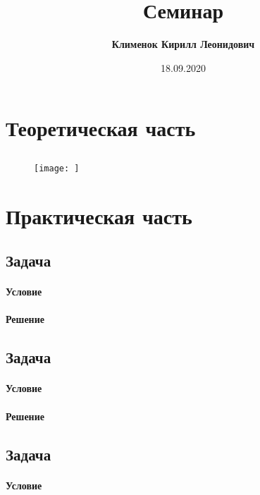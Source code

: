 \documentclass[12pt]{article}
\begin{document}
 
\title{\textbf{Семинар }}
\author{\textbf{Клименок Кирилл Леонидович}}
\date{18.09.2020}
\maketitle
\section{Теоретическая часть}
\subsection{}


\begin{figure}[h]
    \centering
    \texttt{[image: ]}
    \caption{}
    \label{fig:sem_04}
\end{figure}


\section{Практическая часть}
\subsection{Задача}
\label{task_}
\paragraph{Условие}
\paragraph{Решение}

\subsection{Задача}
\label{task_}
\paragraph{Условие}
\paragraph{Решение}

\subsection{Задача}
\label{task_}
\paragraph{Условие}
\end{document}
